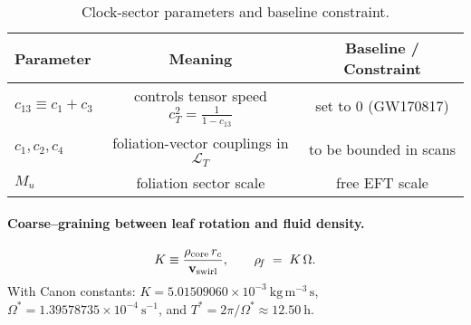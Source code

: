 \begin{table}[h]
\centering
\caption{Clock-sector parameters and baseline constraint.}
\begin{tabular}{lcc}
\hline
Parameter & Meaning & Baseline / Constraint \\
\hline
$c_{13} \equiv c_1 + c_3$ & controls tensor speed $c_T^2=\frac{1}{1-c_{13}}$ & set to $0$ (GW170817) \\
$c_1,c_2,c_4$ & foliation-vector couplings in $\mathcal{L}_T$ & to be bounded in scans \\
$M_u$ & foliation sector scale & free EFT scale \\
\hline
\end{tabular}
\end{table}

\paragraph{Coarse--graining between leaf rotation and fluid density.}
\begin{equation}
K \equiv \frac{\rho_{\mathrm{core}}\, r_c}{\mathbf{v}_{\mathrm{swirl}}},
\qquad
\rho_{\!f} \;=\; K\,\Omega .
\end{equation}
With Canon constants: \(K = 5.01509060\times 10^{-3}\ \mathrm{kg\,m^{-3}\,s}\), \(\Omega^\ast = 1.39578735\times 10^{-4}\ \mathrm{s^{-1}}\), and \(T^\ast=2\pi/\Omega^\ast\approx 12.50\ \mathrm{h}\).
